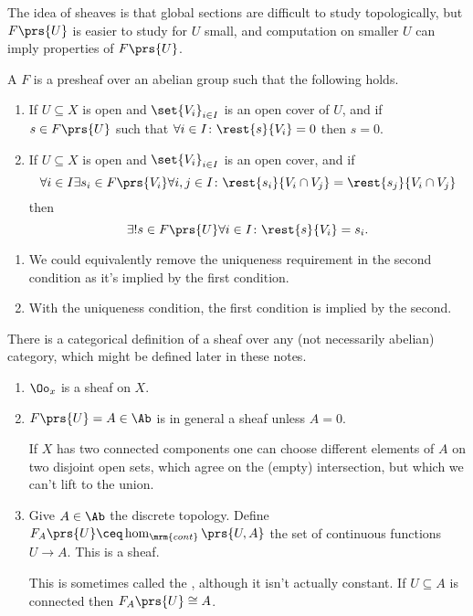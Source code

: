 \documentclass[10pt,a4paper,twoside,openany,hidelinks]{book}
\begin{document}
The idea of sheaves is that global sections are difficult to study topologically, but $F\prs{U}$ is easier to study for $U$ small, and computation on smaller $U$ can imply properties of $F\prs{U}$.

\begin{definition}[Sheaf]
A  $F$ is a presheaf over an abelian group such that the following holds.
\begin{enumerate}
\item If $U \subseteq X$ is open and $\set{V_i}_{i \in I}$ is an open cover of $U$, and if $s \in F\prs{U}$ such that $\forall i \in I \colon \rest{s}{V_i} = 0$ then $s = 0$.
\item If $U \subseteq X$ is open and $\set{V_i}_{i \in I}$ is an open cover, and if \[\forall i \in I \exists s_i \in F\prs{V_i} \forall i,j \in I \colon \rest{s_i}{V_i \cap V_j} = \rest{s_j}{V_i \cap V_j}\]
then
\[\exists ! s \in F\prs{U} \forall i \in I \colon \rest{s}{V_i} = s_i \text{.}\]
\end{enumerate}
\end{definition}

\begin{remark}
\begin{enumerate}
\item
We could equivalently remove the uniqueness requirement in the second condition as it's implied by the first condition.
\item
With the uniqueness condition, the first condition is implied by the second.
\end{enumerate}
\end{remark}

\begin{remark}
There is a categorical definition of a sheaf over any (not necessarily abelian) category, which might be defined later in these notes.
\end{remark}

\begin{examples}
\begin{enumerate}
\item $\Oo_x$ is a sheaf on $X$.
\item $F\prs{U} = A \in \Ab$ is  in general a sheaf unless $A = 0$.

If $X$ has two connected components one can choose different elements of $A$ on two disjoint open sets, which agree on the (empty) intersection, but which we can't lift to the union.
\item Give $A \in \Ab$ the discrete topology.
Define $F_A\prs{U} \ceq \hom_{\mrm{cont}}\prs{U,A}$ the set of continuous functions $U \to A$.
This is a sheaf.

This is sometimes called the , although it isn't actually constant.
If $U \subseteq A$ is connected then $F_A\prs{U} \cong A$.
\end{enumerate}
\end{examples}
\end{document}
